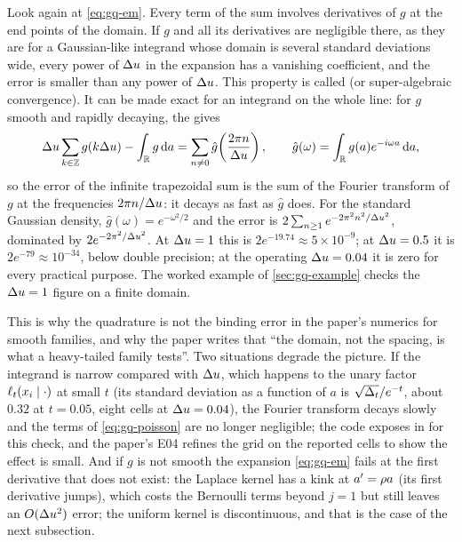 Look again at \cref{eq:gq-em}. Every term of the sum involves derivatives of $g$ at the
end points of the domain. If $g$ and all its derivatives are negligible there, as they
are for a Gaussian-like integrand whose domain is several standard deviations wide,
every power of $\Delta u$ in the expansion has a vanishing coefficient, and the error is
smaller than any power of $\Delta u$. This property is called 
(or super-algebraic convergence). It can be made exact for an integrand on the whole
line: for $g$ smooth and rapidly decaying, the  gives
\begin{equation}
  \Delta u\sum_{k\in\mathbb{Z}}g(k\Delta u)-\int_{\mathbb{R}} g\,\mathrm{d} a
  =\sum_{n\ne0}\hat g\!\left(\frac{2\pi n}{\Delta u}\right),\qquad
  \hat g(\omega)=\int_{\mathbb{R}} g(a)e^{-i\omega a}\,\mathrm{d} a,
  \label{eq:gq-poisson}
\end{equation}
so the error of the infinite trapezoidal sum is the sum of the Fourier transform of
$g$ at the frequencies $2\pi n/\Delta u$: it decays as fast as $\hat g$ does. For the
standard Gaussian density, $\hat g(\omega)=e^{-\omega^2/2}$ and the error is
$2\sum_{n\ge1}e^{-2\pi^2n^2/\Delta u^2}$, dominated by $2e^{-2\pi^2/\Delta u^2}$. At
$\Delta u=1$ this is $2e^{-19.74}\approx5\times10^{-9}$; at $\Delta u=0.5$ it is
$2e^{-79}\approx10^{-34}$, below double precision; at the operating $\Delta u=0.04$ it
is zero for every practical purpose. The worked example of \cref{sec:gq-example}
checks the $\Delta u=1$ figure on a finite domain.

This is why the quadrature is not the binding error in the paper's numerics for smooth
families, and why the paper writes that ``the domain, not the spacing, is what a
heavy-tailed family tests''. Two situations degrade the picture. If the integrand is
narrow compared with $\Delta u$, which happens to the unary factor
$\ell_t(x_i\mid\cdot)$ at small $t$ (its standard deviation as a function of $a$ is
$\sqrt{\Delta_t}/e^{-t}$, about $0.32$ at $t=0.05$, eight cells at $\Delta u=0.04$), the
Fourier transform decays slowly and the terms of \cref{eq:gq-poisson} are no longer
negligible; the code exposes  in
 for this check, and the paper's E04 refines the
grid on the reported cells to show the effect is small. And if $g$ is not smooth the
expansion \cref{eq:gq-em} fails at the first derivative that does not exist: the
Laplace kernel has a kink at $a'=\rho a$ (its first derivative jumps), which costs
the Bernoulli terms beyond $j=1$ but still leaves an $O(\Delta u^2)$ error; the uniform
kernel is discontinuous, and that is the case of the next subsection.

